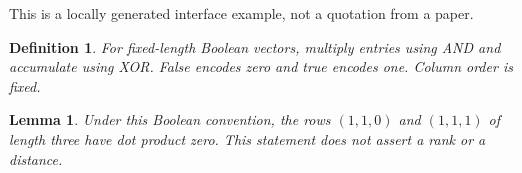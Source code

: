 \documentclass{article}
\newtheorem{definition}{Definition}
\newtheorem{lemma}{Lemma}
\begin{document}
This is a locally generated interface example, not a quotation from a paper.
\begin{definition}\label{def:boolean-dot}
For fixed-length Boolean vectors, multiply entries using AND and accumulate
using XOR. False encodes zero and true encodes one. Column order is fixed.
\end{definition}
\begin{lemma}\label{lem:boolean-row-pair}
Under this Boolean convention, the rows $(1,1,0)$ and $(1,1,1)$ of length three
have dot product zero. This statement does not assert a rank or a distance.
\end{lemma}
\end{document}
